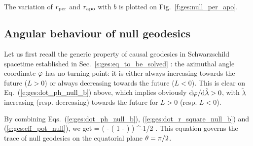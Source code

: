 The variation of $r_{\rm per}$ and $r_{\rm apo}$ with $b$ is plotted
on Fig.~\ref{f:ges:null_per_apo}.



\subsection{Angular behaviour of null geodesics}

Let us first recall the generic property of causal geodesics in Schwarzschild
spacetime established in Sec.~\ref{s:ges:eq_to_be_solved} : the azimuthal
angle coordinate $\varphi$ has no turning point: it is either always increasing
towards the future
($L>0$) or always decreasing towards the future ($L<0$). This is clear on
Eq.~(\ref{e:ges:dot_ph_null_b}) above, which implies obviously
$\mathrm{d}\varphi/\mathrm{d}\tilde{\lambda} > 0$, with $\tilde{\lambda}$ increasing (resp. decreasing)
towards the future for $L>0$ (resp. $L<0$).

By combining Eqs.~(\ref{e:ges:dot_ph_null_b}), (\ref{e:ges:dot_r_square_null_b})
and (\ref{e:ges:eff_pot_null}), we get
\be \label{e:ges:dphi_dr_null}
     = \pm {} \left( 
        -  \left( 1 -  \right) \right) ^{-1/2} .
\ee
This equation governs the trace of null geodesics on the equatorial plane
$\theta=\pi/2$.

